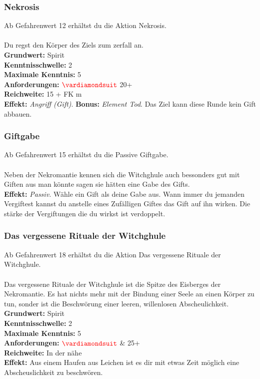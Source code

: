\subsubsection*{ Nekrosis} \label{sk:nekrosis}
Ab Gefahrenwert 12 erhältst du die Aktion Nekrosis.\\
\\
Du regst den Körper des Ziels zum zerfall an. \\
\textbf{Grundwert:} Spirit \\
\textbf{Kenntnisschwelle:} 2 \\
\textbf{Maximale Kenntnis:} 5 \\
\textbf{Anforderungen:} $\Karo{}$ 20+ \\
\textbf{Reichweite:} 15 + FK m \\
\textbf{Effekt:} \textit{Angriff (Gift)}. \textbf{Bonus:} \textit{Element Tod}. Das Ziel kann diese Runde kein Gift abbauen.

\subsubsection*{ Giftgabe} \label{sk:giftgabe}
Ab Gefahrenwert 15 erhältst du die Passive Giftgabe.\\
\\
Neben der Nekromantie kennen sich die Witchghule auch bessonders gut mit Giften aus man könnte sagen sie hätten eine Gabe des Gifts. \\
\textbf{Effekt:} \textit{Passiv.} Wähle ein Gift als deine Gabe aus. Wann immer du jemanden Vergiftest kannst du anstelle eines Zufälligen Giftes das Gift auf ihn wirken. Die stärke der Vergiftungen die du wirkst ist verdoppelt.

\subsubsection*{ Das vergessene Rituale der Witchghule} \label{sk:leichensucher}
Ab Gefahrenwert 18 erhältst du die Aktion Das vergessene Rituale der Witchghule.\\
\\
Das vergessene Rituale der Witchghule ist die Spitze des Eisberges der Nekromantie. Es hat nichts mehr mit der Bindung einer Seele an einen Körper zu tun, sonder ist die Beschwörung einer leeren, willenlosen Abscheulichkeit. \\
\textbf{Grundwert:} Spirit \\
\textbf{Kenntnisschwelle:} 2 \\
\textbf{Maximale Kenntnis:} 5 \\
\textbf{Anforderungen:} $\Karo{}$ \& 25+ \\
\textbf{Reichweite:} In der nähe \\
\textbf{Effekt:} Aus einem Haufen aus Leichen ist es dir mit etwas Zeit möglich eine Abscheuslichkeit  zu beschwören.


